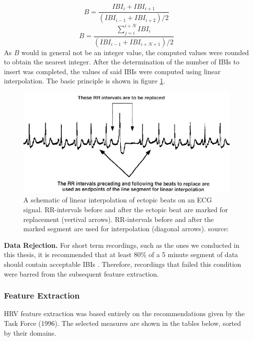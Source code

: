 \begin{equation}\label{Bsingle}
B = \frac{IBI_{i}+IBI_{i+1}}{(IBI_{i-1}+IBI_{i+2})/2}
\end{equation}
\begin{equation}\label{Bseq}
B = \frac{\sum_{j=i}^{i+N} IBI_{i}}{(IBI_{i-1}+IBI_{i+N+1})/2}
\end{equation}
As $B$ would in general not be an integer value, the computed values were rounded to obtain the nearest integer. After the determination of the number of IBIs to insert was completed, the values of said IBIs were computed using linear interpolation. The basic principle is shown in figure \ref{ebrep}.

\begin{figure}[h!]
	\centering
  \includegraphics[width=1.0\textwidth, angle=0]{images/eb_replacement.jpg}
	\caption[Linear Interpolation of Ectopic Beats]{A schematic of linear interpolation of ectopic beats on an ECG signal. RR-intervals before and after the ectopic beat are marked for replacement (vertival arrows). RR-intervals before and after the marked segment are used for interpolation (diagonal arrows). source: \cite{Lippman1994}}
	\label{ebrep}
\end{figure}
\textbf{Data Rejection.} For short term recordings, such as the ones we conducted in this thesis, it is recommended that at least 80\% of a 5 minute segment of data should contain acceptable IBIs \cite{Clifford2002}. Therefore, recordings that failed this condition were barred from the subsequent feature extraction.


\newpage
\subsubsection{Feature Extraction}
HRV feature extraction was based entirely on the recommendations given by the Task Force (1996). The selected measures are shown in the tables below, sorted by their domains.

